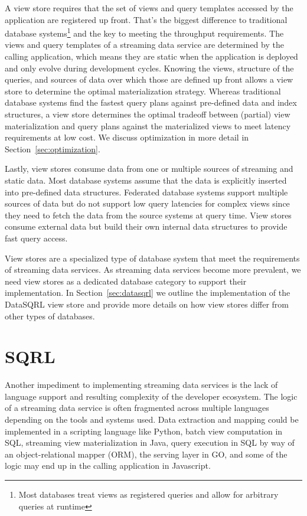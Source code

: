\documentclass[	DIV=calc,%
							paper=letter,%
							fontsize=11pt,%
							twocolumn]{scrartcl}	 					%
\begin{document}
A view store requires that the set of views and query templates accessed by the application are registered up front. That's the biggest difference to traditional database systems\footnote{Most databases treat views as registered queries and allow for arbitrary queries at runtime} and the key to meeting the throughput requirements. The views and query templates of a streaming data service are determined by the calling application, which means they are static when the application is deployed and only evolve during development cycles. Knowing the views, structure of the queries, and sources of data over which those are defined up front allows a view store to determine the optimal materialization strategy. Whereas traditional database systems find the fastest query plans against pre-defined data and index structures, a view store determines the optimal tradeoff between (partial) view materialization and query plans against the materialized views to meet latency requirements at low cost. We discuss optimization in more detail in Section~\ref{sec:optimization}.

Lastly, view stores consume data from one or multiple sources of streaming and static data. Most database systems assume that the data is explicitly inserted into pre-defined data structures. Federated database systems support multiple sources of data but do not support low query latencies for complex views since they need to fetch the data from the source systems at query time. View stores consume external data but build their own internal data structures to provide fast query access.

View stores are a specialized type of database system that meet the requirements of streaming data services. As streaming data services become more prevalent, we need view stores as a dedicated database category to support their implementation.
In Section~\ref{sec:datasqrl} we outline the implementation of the DataSQRL view store and provide more details on how view stores differ from other types of databases.


\section{SQRL}
\label{sec:sqrl}

Another impediment to implementing streaming data services is the lack of language support and resulting complexity of the developer ecosystem. The logic of a streaming data service is often fragmented across multiple languages depending on the tools and systems used. Data extraction and mapping could be implemented in a scripting language like Python, batch view computation in SQL, streaming view materialization in Java, query execution in SQL by way of an object-relational mapper (ORM), the serving layer in GO, and some of the logic may end up in the calling application in Javascript.
\end{document}
